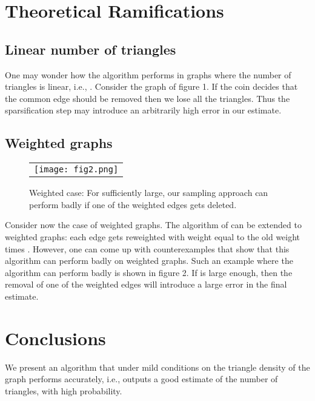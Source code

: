 \documentclass{llncs}
\begin{document}
\section{Theoretical Ramifications} 
\label{sec:ramifications}
\subsection{Linear number of triangles}

One may wonder how the algorithm performs in graphs where the number of triangles is linear, i.e., .
Consider the graph of figure 1. If the coin decides that the common
edge should be removed then we lose all the triangles. Thus the sparsification step may introduce 
an arbitrarily high error in our estimate.


\subsection{Weighted graphs}

\begin{figure}
    \begin{center}
        \begin{tabular}{c}
		    \texttt{[image: fig2.png]} \\
	  \end{tabular}	    
		\caption{ Weighted case: For  sufficiently large, our sampling approach can perform badly if one of the weighted edges gets deleted. }
		\end{center}
	\label{fig:fig2}
\end{figure}

Consider now the case of weighted graphs. The algorithm of \cite{Tsourakakiskdd09}
can be extended to weighted graphs: each edge gets reweighted with weight equal to 
the old weight times . 
However, one can come up with counterexamples that show that this algorithm 
can perform badly on weighted graphs.
Such an example where the algorithm can perform badly is shown in figure 2.
If  is large enough, then the removal of one of the weighted edges will introduce 
a large error in the final estimate. 

\section{Conclusions}
\label{sec:concl}
We present an algorithm that under mild conditions on the triangle density of the graph
performs accurately, i.e., outputs a good estimate of the number of triangles, with high probability. 
\end{document}
